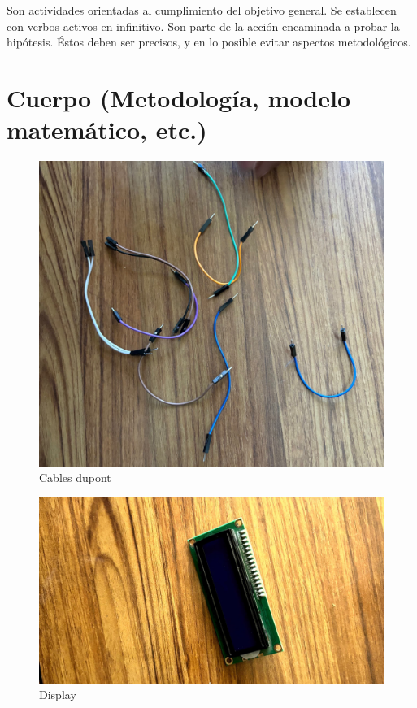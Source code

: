     Son actividades orientadas al cumplimiento del objetivo general. Se establecen con verbos activos en infinitivo. Son parte de la acción encaminada a probar la hipótesis. Éstos deben ser precisos, y en lo posible evitar aspectos metodológicos.
    \section{Cuerpo (Metodología, modelo matemático, etc.)}
    \begin{figure}[H]
        \centering
        \includegraphics[trim = {1mm 1mm 1mm 1mm},clip,scale=0.2]{8/Img/Cables dupont.pdf}
        \caption{Cables dupont}
        \label{fig:enter-label}
    \end{figure}
    
    \begin{figure}[H]
        \centering
        \includegraphics[trim = {80mm 1mm 60mm 1mm},clip,scale=0.2]{8/Img/Display.pdf}
        \caption{Display}
        \label{fig:enter-label}
    \end{figure}
    
